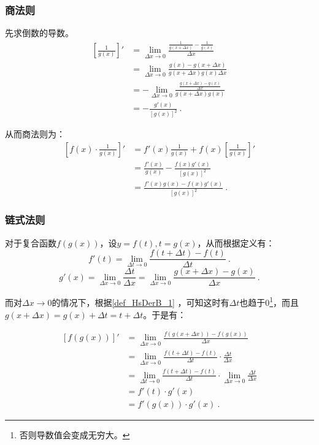 \subsubsection{商法则}
先求倒数的导数。
\begin{equation}
\begin{split}
\left[\frac{1}{g(x)}\right]'&=\lim_{\Delta x\to 0}\frac{\displaystyle\frac{1}{g(x+\Delta x)}-\frac{1}{g(x)}}{\Delta x}\\
&=\lim_{\Delta x\to 0}\frac{g(x)-g(x+\Delta x)}{g(x+\Delta x)g(x)\Delta x}\\
&=-\lim_{\Delta x\to 0}\frac{\frac{g(x+\Delta x)-g(x)}{\Delta x}}{g(x+\Delta x)g(x)}\\
&=-\frac{g'(x)}{[g(x)]^2}~.
\end{split}
\end{equation}

从而商法则为：
\begin{equation}
\begin{split}
\left[f(x)\cdot \frac{1}{g(x)}\right]'&=f'(x)\frac{1}{g(x)}+f(x) [\frac{1}{g(x)}]'\\
&=\frac{f'(x)}{g(x)}-\frac{f(x)g'(x)}{[g(x)]^2}\\
&=\frac{f'(x)g(x)-f(x)g'(x)}{[g(x)]^2}~.
\end{split}
\end{equation}

\subsubsection{链式法则}

对于复合函数$f\left(g(x)\right)$，设$y=f(t),t=g(x)$，从而根据定义有：
\begin{equation}
f'(t)=\lim_{\Delta t\to 0}\frac{f(t+\Delta t)-f(t)}{\Delta t}~.
\end{equation}
\begin{equation}
g'(x)=\lim_{\Delta x\to 0}\frac{\Delta t}{\Delta x}=\lim_{\Delta x\to 0}\frac{g(x+\Delta x)-g(x)}{\Delta x}~.
\end{equation}

而对$\Delta x\to 0$的情况下，根据\autoref{def_HsDerB_1} ，可知这时有$\Delta t$也趋于0\footnote{否则导数值会变成无穷大。}，而且$g(x+\Delta x)=g(x)+\Delta t=t+\Delta t$。于是有：

\begin{equation}
\begin{split}
\left[f(g(x))\right]'&=\lim_{\Delta x\to 0}\frac{f(g(x+\Delta x))-f(g(x))}{\Delta x}\\
&=\lim_{\Delta x\to 0}\frac{f(t+\Delta t)-f(t)}{\Delta t}\cdot\frac{\Delta t}{\Delta x}\\
&=\lim_{\Delta t\to 0}\frac{f(t+\Delta t)-f(t)}{\Delta t}\cdot\lim_{\Delta x\to 0}\frac{\Delta t}{\Delta x}\\
&=f'(t)\cdot g'(x)\\
&=f'(g(x))\cdot g'(x)~.
\end{split}
\end{equation}
